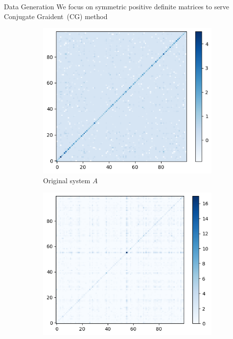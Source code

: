 \documentclass[aspectratio=169]{beamer}
\begin{document}
\begin{frame}{Data Generation}
    We focus on symmetric positive definite matrices to serve Conjugate Graident~(CG) method
    \begin{figure}
        \centering
        \begin{subfigure}{0.3\textwidth} 
            \centering
            \includegraphics[width=\linewidth]{./figures/example_SPD_matrix.png}
            \caption{Original system $A$}
        \end{subfigure}
        \begin{subfigure}{0.3\textwidth} 
            \centering
            \includegraphics[width=\linewidth]{./figures/example-ILU.png}

\end{subfigure}
\end{figure}
\end{frame}
\end{document}
